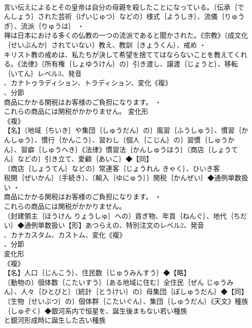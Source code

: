 \documentclass[8pt]{extreport}
\begin{document}
\begin{CJK}{UTF8}{min}
\\	言い伝えによるとその皇帝は自分の母親を殺したことになっている。〔伝承｛でんしょう｝された芸術｛げいじゅつ｝などの〕様式｛ようしき｝、流儀｛りゅうぎ｝、流派｛りゅうは｝ ・
\\	禅は日本における多くの仏教の一つの流派であると聞かされた。《宗教》〔成文化｛せいぶんか｝されていない〕教え、教訓｛きょうくん｝、戒め ・
\\	キリスト教の戒めは、私たちが決して希望を捨ててはならないことを教えてくれる。《法律》〔所有権｛しょゆうけん｝の〕引き渡し、譲渡｛じょうと｝、移転｛いてん｝レベル3、発音
\\	、カナトゥラディション、トラディション、変化《複》
\\	、分節
\\	商品にかかる関税はお客様のご負担になります。 ・
\\	これらの商品には関税がかかりません。	変化形 
\\	《複》
\\	【名】〔地域｛ちいき｝や集団｛しゅうだん｝の〕風習｛ふうしゅう｝、慣習｛かんしゅう｝、慣行｛かんこう｝、習わし〔個人｛こじん｝の〕習慣｛しゅうかん｝、習癖｛しゅうへき｝《法律》慣習法｛かんしゅうほう｝〔商店｛しょうてん｝などの〕引き立て、愛顧｛あいこ｝◆【同】
\\	〔商店｛しょうてん｝などの〕常連客｛じょうれん きゃく｝、ひいき客
\\	税関｛ぜいかん｝（手続き）、〔輸入｛ゆにゅう｝〕関税｛かんぜい｝◆通例単数扱い ・
\\	商品にかかる関税はお客様のご負担になります。 ・
\\	これらの商品には関税がかかりません。
\\	〔封建領主｛ほうけん りょうしゅ｝への〕貢ぎ物、年貢｛ねんぐ｝、地代｛ちだい｝◆通例単数扱い【形】あつらえの、特別注文のレベル2、発音
\\	、カナカスタム、カストム、変化《複》
\\	、分節
\\	変化形 
\\	《複》
\\	【名】人口｛じんこう｝、住民数｛じゅうみんすう｝◆【略】
\\	〔動物の〕個体数｛こたいすう｝〔ある地域に住む〕全住民｛ぜん じゅうみん｝、人々｛ひとびと｝〔統計｛とうけい｝の〕母集団｛ぼしゅうだん｝◆【同】
\\	〔生物｛せいぶつ｝の〕個体群｛こたいぐん｝、集団｛しゅうだん｝《天文》種族｛しゅぞく｝◆銀河系内で恒星を、誕生後まもない若い種族
\\	と銀河形成時に誕生した古い種族

\end{CJK}
\end{document}
